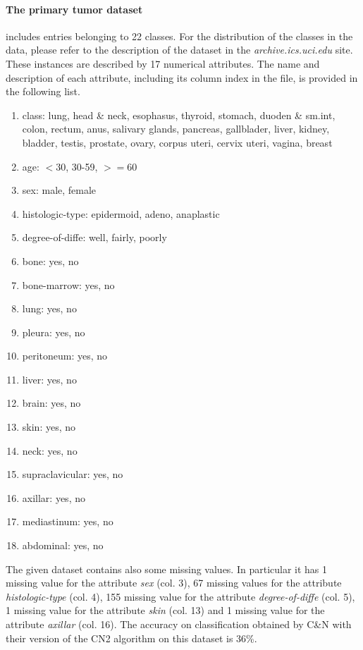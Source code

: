 \documentclass{article}
\begin{document}
\paragraph{The primary tumor dataset} includes entries belonging to 22 classes. For the distribution of the classes in the data, please refer to the description of the dataset in the \textit{archive.ics.uci.edu} site. These instances are described by 17 numerical attributes. The name and description of each attribute, including its column index in the file, is provided in the following list.
\begin{enumerate}\addtocounter{enumi}{-1}
    \item class: lung, head \& neck, esophasus, thyroid, stomach, duoden \& sm.int, colon, rectum, anus, salivary glands, pancreas, gallblader, liver, kidney, bladder, testis, prostate, ovary, corpus uteri, cervix uteri, vagina, breast
    \item age:   $<30$, 30-59, $>=60$
    \item sex:   male, female
    \item histologic-type: epidermoid, adeno, anaplastic
    \item degree-of-diffe: well, fairly, poorly
    \item bone: yes, no
    \item bone-marrow: yes, no
    \item lung: yes, no
    \item pleura: yes, no
    \item peritoneum: yes, no
    \item liver: yes, no
    \item brain: yes, no
    \item skin: yes, no
    \item neck: yes, no
    \item supraclavicular: yes, no
    \item axillar: yes, no
    \item mediastinum: yes, no
    \item abdominal: yes, no
\end{enumerate}
The given dataset contains also some missing values. In particular it has 1 missing value for the attribute \textit{sex} (col. 3), 67 missing values for the attribute \textit{histologic-type} (col. 4), 155 missing value for the attribute \textit{degree-of-diffe} (col. 5), 1 missing value for the attribute \textit{skin} (col. 13) and 1 missing value for the attribute \textit{axillar} (col. 16).
\vspace{12pt}\newline
The accuracy on classification obtained by C\&N with their version of the CN2 algorithm on this dataset is 36\%.
\end{document}
